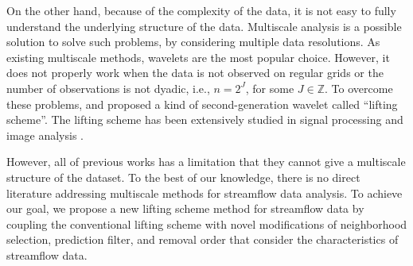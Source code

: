 \documentclass[11pt,titlepage]{article}
\begin{document}



On the other hand, because of the complexity of the data, it is not easy to fully understand the underlying structure of the data. Multiscale analysis is a possible solution to solve such problems, by considering multiple data resolutions. As existing multiscale methods, wavelets are the most popular choice. However, it does not properly work when the data is not observed on regular grids or the number of observations is not dyadic, i.e., $n=2^{J}$, for some $J\in \mathbb{Z}$. To overcome these problems, \citet{Sweldens1996} and \citet{Sweldens1998} proposed a kind of second-generation wavelet called ``lifting scheme''. The lifting scheme has been extensively studied in signal processing and image analysis \citep{Jansen2005}. 

However, all of previous works has a limitation that they cannot give a multiscale structure of the dataset. To the best of our knowledge, there is no direct literature addressing multiscale methods for streamflow data analysis.  
To achieve our goal, we propose a new lifting scheme method for streamflow data by coupling the conventional lifting scheme with novel modifications of neighborhood selection, prediction filter, and removal order that consider the characteristics of streamflow data. 
\end{document}
